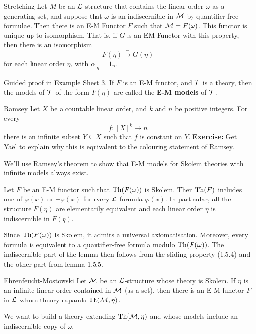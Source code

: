 \documentclass{article}
\numberwithin{thm}{subsection}
\begin{document}
\begin{fancylem}{Stretching}
    Let $M$ be an $\mathcal{L}$-structure that contains the linear order $\omega$ as a generating set, and suppose that $\omega$ is an indiscernible in $\mathcal{M}$ by quantifier-free formulae. Then there is an E-M Functor $F$ such that $\mathcal{M} = F(\omega)$. This functor is unique up to isomorphism. That is, if $G$ is an EM-Functor with this property, then there is an isomorphism \[ F(\eta) \xrightarrow{\sim} G(\eta)\] for each linear order $\eta$, with $\alpha|_{\eta}=1_{\eta}$.
\end{fancylem}
\proof Guided proof in Example Sheet 3.\endproof 
If $F$ is an E-M functor, and $\mathcal{T}$ is a theory, then the models of $\mathcal{T}$ of the form $F(\eta)$ are called the \textbf{E-M models} of $\mathcal{T}$.
\begin{fancythm}{Ramsey}
    Let $X$ be a countable linear order, and $k$ and $n$ be positive integers. For every \[ f: [X]^{k} \to n\] there is an infinite subset $Y \subseteq X$ such that $f$ is constant on $Y$. \gap 
    \textbf{Exercise:} Get Ya\"el to explain why this is equivalent to the colouring statement of Ramsey.
\end{fancythm}
We'll use Ramsey's theorem to show that E-M models for Skolem theories with infinite models always exist.
\begin{fancylem}{}
    Let $F$ be an E-M functor such that $\operatorname{Th}(F(\omega))$ is Skolem. Then $\operatorname{Th}(F)$ includes one of $\varphi(\bar x)$ or $\neg \varphi(\bar x)$ for every $\mathcal{L}$-formula $\varphi(\bar x).$ In particular, all the structure $F(\eta)$ are elementarily equivalent and each linear order $\eta$ is indiscernible in $F(\eta)$.
\end{fancylem}
\proof Since $\operatorname{Th}(F(\omega))$ is Skolem, it admits a universal axiomatisation. Moreover, every formula is equivalent to a quantifier-free formula modulo $\operatorname{Th}(F(\omega))$. The indiscernible part of the lemma then follows from the sliding property (1.5.4) and the other part from lemma 1.5.5.
\endproof 
\begin{fancythm}{Ehrenfeucht-Mostowski}
    Let $\mathcal{M}$ be an $\mathcal{L}$-structure whose theory is Skolem. If $\eta$ is an infinite linear order contained in $\mathcal{M}$ (as a set), then there is an E-M functor $F$ in $\mathcal{L}$ whose theory expands $\operatorname{Th}(\mathcal{M}, \eta)$.
\end{fancythm}
\proof We want to build a theory extending $\operatorname{Th}(\mathcal{M}, \eta)$ and whose models include an indiscernible copy of $\omega$.\gap 
\end{document}
